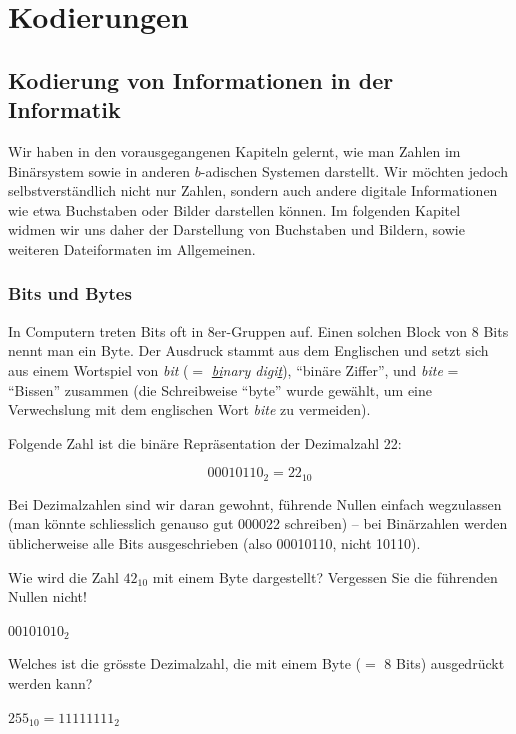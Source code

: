 \chapter{Kodierungen}
\section{Kodierung von Informationen in der Informatik}

Wir haben in den vorausgegangenen Kapiteln gelernt, wie man Zahlen im Binärsystem sowie in anderen $b$-adischen Systemen darstellt. Wir möchten jedoch selbstverständlich nicht nur Zahlen, sondern auch andere digitale Informationen wie etwa Buchstaben oder Bilder darstellen können. Im folgenden Kapitel widmen wir uns daher der Darstellung von Buchstaben und Bildern, sowie weiteren Dateiformaten im Allgemeinen.

\subsection{Bits und Bytes}
In Computern treten Bits oft in 8er-Gruppen auf. Einen solchen Block von 8 Bits nennt man ein Byte. Der Ausdruck stammt aus dem Englischen und setzt sich aus einem Wortspiel von \textit{bit} ($=$ \textit{\underline{bi}nary digi\underline{t}}), \enquote{binäre Ziffer}, und \textit{bite} = \enquote{Bissen} zusammen (die Schreibweise \enquote{byte} wurde gewählt, um eine Verwechslung mit dem englischen Wort \textit{bite} zu vermeiden).

Folgende Zahl ist die binäre Repräsentation der Dezimalzahl 22:

\[00010110_2 = 22_{10}\]

Bei Dezimalzahlen sind wir daran gewohnt, führende Nullen einfach wegzulassen (man könnte schliesslich genauso gut 000022 schreiben) – bei Binärzahlen werden üblicherweise alle Bits ausgeschrieben (also 00010110, nicht 10110).

\begin{myexercise}
	Wie wird die Zahl $42_{10}$ mit einem Byte dargestellt? Vergessen Sie die führenden Nullen nicht!
	\begin{myanswer}
		$00101010_2$
	\end{myanswer}
\end{myexercise}

\begin{myexercise}
	\label{ex:byte-max}
	Welches ist die grösste Dezimalzahl, die mit einem Byte ($=$ 8 Bits) ausgedrückt werden kann?
	\begin{myanswer}
		$255_{10} = 11111111_2$
	\end{myanswer}
\end{myexercise}


